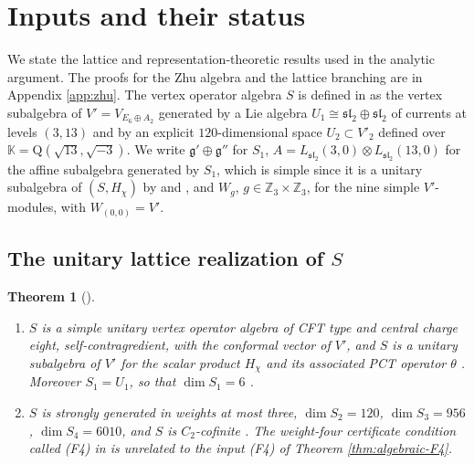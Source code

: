 \documentclass[leqno]{article}
\newcommand{\K}{\ensuremath{\mathbb{K}}}
\newcommand{\Q}{\mathrm{Q}}
\newcommand{\Z}{\ensuremath{\mathbb{Z}}}
\newcommand{\ot}{\otimes}
\newtheorem{thm}{Theorem}[section]
\numberwithin{equation}{section}
\begin{document}
\section{Inputs and their status}
\label{sec:inputs}

We state the lattice and representation-theoretic results used in the analytic argument. The proofs for the Zhu algebra and the lattice branching are in Appendix \ref{app:zhu}. The vertex operator algebra $S$ is defined in \cite[Theorems 10.9 and 10.21]{Arh26} as the vertex subalgebra of $V' = V_{E_6 \oplus A_2}$ generated by a Lie algebra $U_1 \cong \mathfrak{sl}_2 \oplus \mathfrak{sl}_2$ of currents at levels $(3,13)$ and by an explicit $120$-dimensional space $U_2 \subset V'_2$ defined over $\K = \Q(\sqrt{13},\sqrt{-3})$. We write $\mathfrak g' \oplus \mathfrak g''$ for $S_1$, $A = L_{\mathfrak{sl}_2}(3,0) \ot L_{\mathfrak{sl}_2}(13,0)$ for the affine subalgebra generated by $S_1$, which is simple since it is a unitary subalgebra of $(S,H_\chi)$ by \cite[Theorem 10.10]{Arh26} and \cite[Propositions 5.3 and 5.23 pp.~34 and 43]{CKLW18}, and $W_g$, $g \in \Z_3 \times \Z_3$, for the nine simple $V'$-modules, with $W_{(0,0)} = V'$.


\subsection{The unitary lattice realization of \texorpdfstring{$S$}{S}}

\begin{thm}[{\cite{Arh26}}]
\label{thm:inputs-ArhI}
\begin{enumerate}
\item[\textup{(I1)}] $S$ is a simple unitary vertex operator algebra of CFT type and central charge eight, self-contragredient, with the conformal vector of $V'$, and $S$ is a unitary subalgebra of $V'$ for the scalar product $H_\chi$ and its associated PCT operator $\theta$ \cite[Theorem 10.10]{Arh26}. Moreover $S_1 = U_1$, so that $\dim S_1 = 6$ \cite[Theorem 10.21]{Arh26}.
\item[\textup{(I2)}] $S$ is strongly generated in weights at most three, $\dim S_2 = 120$, $\dim S_3 = 956$, $\dim S_4 = 6010$, and $S$ is $C_2$-cofinite \cite[Proposition 10.17 and Theorem 10.21]{Arh26}. The weight-four certificate condition called (F4) in \cite[Definition 10.16]{Arh26} is unrelated to the input (F4) of Theorem \ref{thm:algebraic-F4}.
\end{enumerate}
\end{thm}
\end{document}
